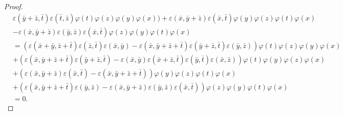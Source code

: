 \documentclass[11pt, twoside]{article}
\begin{document}
\begin{proof}
\begin{align*}
&\varepsilon(\bar{y}+\bar{z},\bar{t})\varepsilon(\bar{t},\bar{z})\varphi(t)\varphi(z)\varphi(y)\varphi(x))+ \varepsilon(\bar{x},\bar{y}+\bar{z})\varepsilon(\bar{x},\bar{t})\varphi(y)\varphi(z)\varphi(t)\varphi(x) \\ & -\varepsilon(\bar{x},\bar{y}+\bar{z})\varepsilon(\bar{y},\bar{z})\varepsilon(\bar{x},\bar{t})\varphi(z)\varphi(y)\varphi(t)\varphi(x) \\
&= (\varepsilon(\bar{x}+\bar{y},\bar{z}+\bar{t})\varepsilon(\bar{z},\bar{t})\varepsilon(\bar{x},\bar{y}) - \varepsilon(\bar{x},\bar{y}+\bar{z}+\bar{t})\varepsilon(\bar{y}+\bar{z},\bar{t})\varepsilon(\bar{y},\bar{z}))\varphi(t)\varphi(z)\varphi(y)\varphi(x) \\
&+ (\varepsilon(\bar{x},\bar{y}+\bar{z}+\bar{t})\varepsilon(\bar{y}+\bar{z},\bar{t})- \varepsilon(\bar{x},\bar{y})\varepsilon(\bar{x}+\bar{z},\bar{t})\varepsilon(\bar{y},\bar{t})\varepsilon(\bar{x},\bar{z}))\varphi(t)\varphi(y)\varphi(z)\varphi(x) \\
    &+ (\varepsilon(\bar{x},\bar{y}+\bar{z})\varepsilon(\bar{x},\bar{t})- \varepsilon(\bar{x},\bar{y}+\bar{z}+\bar{t}))\varphi(y)\varphi(z)\varphi(t)\varphi(x) \\
    &+ (\varepsilon(\bar{x},\bar{y}+\bar{z}+\bar{t})\varepsilon(\bar{y},\bar{z})- \varepsilon(\bar{x},\bar{y}+\bar{z})\varepsilon(\bar{y},\bar{z})\varepsilon(\bar{x},\bar{t}))\varphi(z)\varphi(y)\varphi(t)\varphi(x) \\
    &= 0. 
    \end{align*}


\end{proof}
\end{document}
